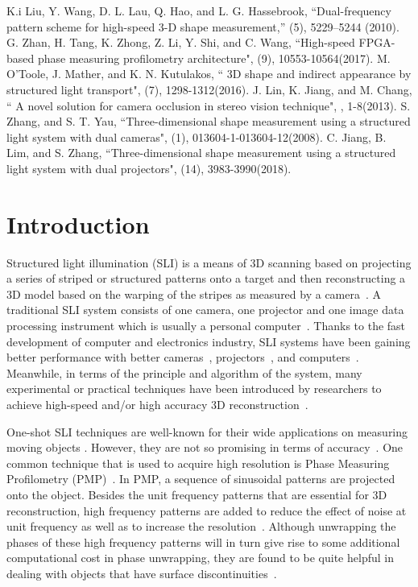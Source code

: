 \documentclass[10pt,letterpaper]{article}
\begin{document}
\begin{thebibliography}{99}
K.i Liu, Y. Wang, D. L. Lau, Q. Hao, and L. G. Hassebrook, ``Dual-frequency pattern scheme for high-speed 3-D shape measurement,'' (5), 5229--5244 (2010).
G. Zhan, H. Tang, K. Zhong, Z. Li, Y. Shi, and C. Wang, ``High-speed FPGA-based phase measuring profilometry architecture", (9), 10553-10564(2017).
M. O'Toole, J. Mather, and K. N. Kutulakos, `` 3D shape and indirect appearance by structured light transport", (7), 1298-1312(2016).
J. Lin, K. Jiang, and  M. Chang, `` A novel solution for camera occlusion in stereo vision technique", , 1-8(2013).
S. Zhang, and S. T. Yau, ``Three-dimensional shape measurement using a structured light system with dual cameras", (1), 013604-1-013604-12(2008).
C. Jiang, B. Lim, and S. Zhang, ``Three-dimensional shape measurement using a structured light system with dual projectors", (14), 3983-3990(2018).

\end{thebibliography} 


\section{Introduction}
Structured light illumination (SLI) is a means of 3D scanning based on projecting a series of striped or structured patterns onto a target and then reconstructing a 3D model based on the warping of the stripes as measured by a camera~\cite{inde78, posd82, boyer87}.  A traditional SLI system consists of one camera, one projector and one image data processing instrument which is usually a personal computer~\cite{??}. Thanks to the fast development of computer and electronics industry, SLI systems have been gaining better performance with better cameras~\cite{??}, projectors~\cite{??}, and computers~\cite{zhan17}. Meanwhile, in terms of the principle and algorithm of the system, many experimental or practical techniques have been introduced by researchers to achieve high-speed and/or high accuracy 3D reconstruction~\cite{??}. 

One-shot SLI techniques are well-known for their wide applications on measuring moving objects \cite{deetjen17}. However, they are not so promising in terms of accuracy~\cite{zhan12}. One common technique that is used to acquire high resolution is Phase Measuring Profilometry (PMP)~\cite{srin85}. In PMP, a sequence of sinusoidal patterns are projected onto the object.  Besides the unit frequency patterns that are essential for 3D reconstruction, high frequency patterns are added to reduce the effect of noise at unit frequency as well as to increase the resolution~\cite{??}. Although unwrapping the phases of these high frequency patterns will in turn give rise to some additional computational cost in phase unwrapping, they are found to be quite helpful in dealing with objects that have surface discontinuities~\cite{lieb05, siva10}. 
\end{document}
